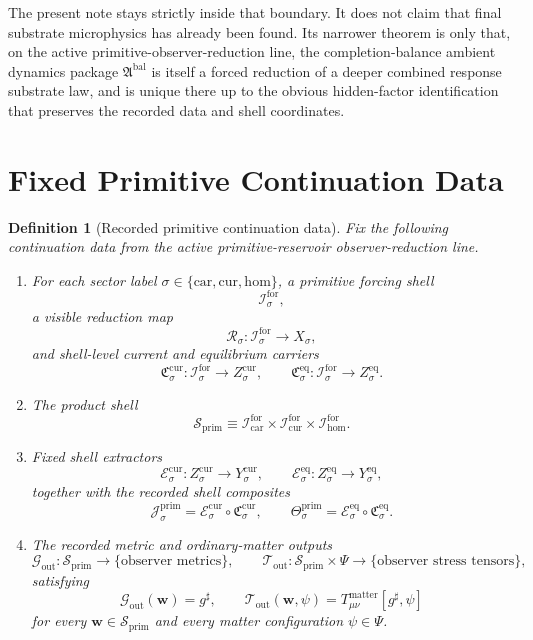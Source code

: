 \documentclass[11pt]{article}
\newcommand{\CompletedMetric}{g^{\sharp}}
\newcommand{\AmbientPackage}{\mathfrak A^{\mathrm{bal}}}
\newcommand{\Car}{\mathrm{car}}
\newcommand{\Cur}{\mathrm{cur}}
\newcommand{\Hom}{\mathrm{hom}}
\newcommand{\ForSpace}[1]{\mathcal I_{#1}^{\mathrm{for}}}
\newcommand{\PrimShell}{\mathcal S_{\mathrm{prim}}}
\newcommand{\Reduction}[1]{\mathcal R_{#1}}
\newcommand{\CurrentCarrier}[1]{\mathfrak C_{#1}^{\mathrm{cur}}}
\newcommand{\EqCarrier}[1]{\mathfrak C_{#1}^{\mathrm{eq}}}
\newcommand{\CurrentExtract}[1]{\mathscr E_{#1}^{\mathrm{cur}}}
\newcommand{\EqExtract}[1]{\mathscr E_{#1}^{\mathrm{eq}}}
\newcommand{\PrimCurrent}[1]{\mathcal J_{#1}^{\mathrm{prim}}}
\newcommand{\PrimTheta}[1]{\Theta_{#1}^{\mathrm{prim}}}
\newcommand{\MetricOut}{\mathscr G_{\mathrm{out}}}
\newcommand{\MatterOut}{\mathscr T_{\mathrm{out}}}
\newtheorem{definition}{Definition}
\begin{document}
The present note stays strictly inside that boundary. It does not claim that final substrate microphysics has already been found. Its narrower theorem is only that, on the active primitive-observer-reduction line, the completion-balance ambient dynamics package \(\AmbientPackage\) is itself a forced reduction of a deeper combined response substrate law, and is unique there up to the obvious hidden-factor identification that preserves the recorded data and shell coordinates.

\section{Fixed Primitive Continuation Data}

\begin{definition}[Recorded primitive continuation data]
\label{def:fixed}
Fix the following continuation data from the active primitive-reservoir observer-reduction line.
\begin{enumerate}
    \item For each sector label \(\sigma\in\{\Car,\Cur,\Hom\}\), a primitive forcing shell
    \[
    \ForSpace{\sigma},
    \]
    a visible reduction map
    \[
    \Reduction{\sigma}:\ForSpace{\sigma}\to X_{\sigma},
    \]
    and shell-level current and equilibrium carriers
    \[
    \CurrentCarrier{\sigma}:\ForSpace{\sigma}\to Z_{\sigma}^{\mathrm{cur}},
    \qquad
    \EqCarrier{\sigma}:\ForSpace{\sigma}\to Z_{\sigma}^{\mathrm{eq}}.
    \]
    \item The product shell
    \[
    \PrimShell
    \equiv
    \ForSpace{\Car}\times \ForSpace{\Cur}\times \ForSpace{\Hom}.
    \]
    \item Fixed shell extractors
    \[
    \CurrentExtract{\sigma}:Z_{\sigma}^{\mathrm{cur}}\to Y_{\sigma}^{\mathrm{cur}},
    \qquad
    \EqExtract{\sigma}:Z_{\sigma}^{\mathrm{eq}}\to Y_{\sigma}^{\mathrm{eq}},
    \]
    together with the recorded shell composites
    \begin{equation}
    \PrimCurrent{\sigma}
    =
    \CurrentExtract{\sigma}\circ \CurrentCarrier{\sigma},
    \qquad
    \PrimTheta{\sigma}
    =
    \EqExtract{\sigma}\circ \EqCarrier{\sigma}.
    \label{eq:primcomposites}
    \end{equation}
    \item The recorded metric and ordinary-matter outputs
    \[
    \MetricOut:\PrimShell\to\{\text{observer metrics}\},
    \qquad
    \MatterOut:\PrimShell\times\Psi\to\{\text{observer stress tensors}\},
    \]
    satisfying
    \begin{equation}
    \MetricOut(\mathbf w)=\CompletedMetric,
    \qquad
    \MatterOut(\mathbf w,\psi)
    =
    T_{\mu\nu}^{\mathrm{matter}}[\CompletedMetric,\psi]
    \label{eq:fixedoutputs}
    \end{equation}
    for every \(\mathbf w\in\PrimShell\) and every matter configuration \(\psi\in\Psi\).
\end{enumerate}
\end{definition}
\end{document}
